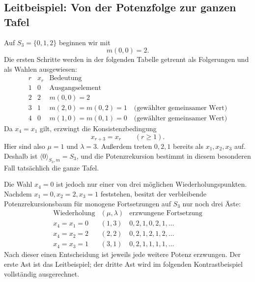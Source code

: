 \documentclass[main.tex]{subfiles}
\begin{document}
\subsection{Leitbeispiel: Von der Potenzfolge zur ganzen Tafel}

Auf \(S_3=\{0,1,2\}\) beginnen wir mit
\[
  m(0,0)=2.
\]
Die ersten Schritte werden in der folgenden Tabelle getrennt als
Folgerungen und als Wahlen ausgewiesen:
\[
\begin{array}{c|c|l}
r&x_r&\text{Bedeutung}\\\hline
1&0&\text{Ausgangselement}\\
2&2&m(0,0)=2\\
3&1&m(2,0)=m(0,2)=1\quad\text{(gewählter gemeinsamer Wert)}\\
4&0&m(1,0)=m(0,1)=0\quad\text{(gewählter gemeinsamer Wert)}
\end{array}
\]
Da \(x_4=x_1\) gilt, erzwingt die Konsistenzbedingung
\[
  x_{r+3}=x_r
  \qquad(r\geq1).
\]
Hier sind also \(\mu=1\) und \(\lambda=3\).  Außerdem treten \(0,2,1\)
bereits als \(x_1,x_2,x_3\) auf.  Deshalb ist
\(\langle0\rangle_{S_3,m}=S_3\), und die Potenzrekursion bestimmt in diesem
besonderen Fall tatsächlich die ganze Tafel.

Die Wahl \(x_4=0\) ist jedoch nur einer von drei möglichen
Wiederholungspunkten.  Nachdem \(x_1=0,x_2=2,x_3=1\) feststehen, besitzt der
verbleibende Potenzrekursionsbaum für monogene Fortsetzungen auf \(S_3\) nur
noch drei Äste:
\[
\begin{array}{c|c|c}
\text{Wiederholung}&(\mu,\lambda)&\text{erzwungene Fortsetzung}\\\hline
x_4=x_1=0&(1,3)&0,2,1,0,2,1,\ldots\\
x_4=x_2=2&(2,2)&0,2,1,2,1,2,\ldots\\
x_4=x_3=1&(3,1)&0,2,1,1,1,1,\ldots
\end{array}
\]
Nach dieser einen Entscheidung ist jeweils jede weitere Potenz erzwungen.
Der erste Ast ist das Leitbeispiel; der dritte Ast wird im folgenden
Kontrastbeispiel vollständig ausgerechnet.
\end{document}
